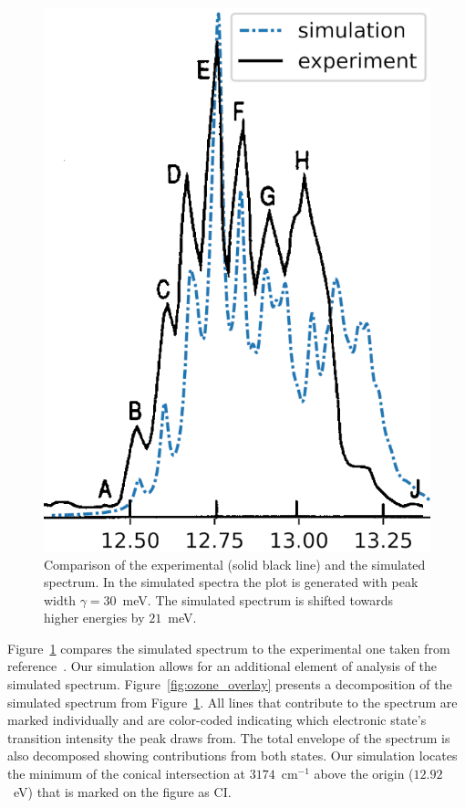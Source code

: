 \documentclass[12pt,a4paper,prb,aps,superscriptaddress]{revtex4}
\begin{document}
\begin{figure}
\includegraphics[width = 8 cm]{figures/sim_vs_Dyke}
\caption{
    Comparison of the experimental (solid black line) and the simulated
    spectrum. In the simulated spectra the plot is generated with peak width
    $\gamma = 30$~meV. The simulated spectrum is shifted towards higher
    energies by $21$~meV.
}
\label{fig:sim_vs_dyke}
\end{figure}

Figure~\ref{fig:sim_vs_dyke} compares the simulated spectrum to the
experimental one taken from reference~\cite{dyke:O3:74}. Our simulation allows
for an additional element of analysis of the simulated spectrum.
Figure~\ref{fig:ozone_overlay} presents a decomposition of the simulated
spectrum from Figure~\ref{fig:sim_vs_dyke}. All lines that contribute to the
spectrum are marked individually and are color-coded indicating which
electronic state's transition intensity the peak draws from. The total
envelope of the spectrum is also decomposed showing contributions from both
states. Our simulation locates the minimum of the conical intersection at
$3174$~cm$^{-1}$ above the origin ($12.92$~eV) that is marked on the figure as
CI.
\end{document}
